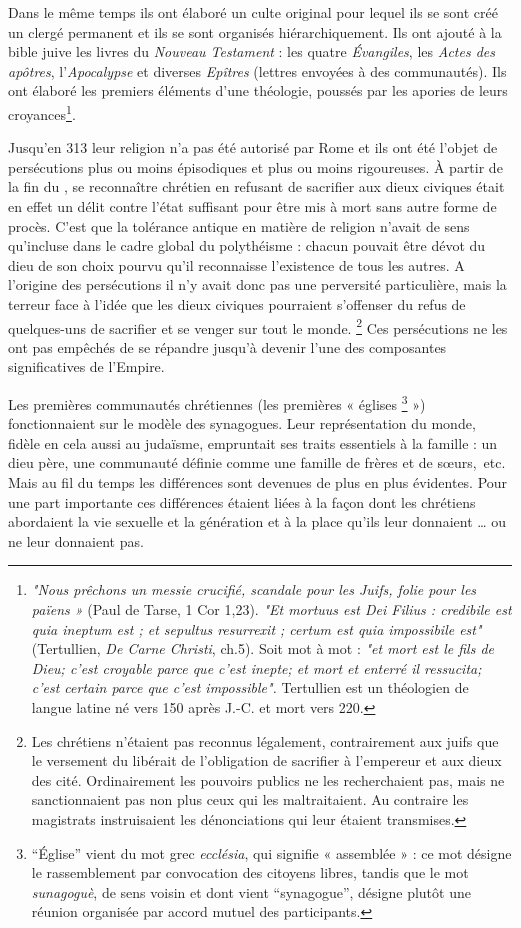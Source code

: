 Dans le même temps ils ont élaboré un culte original pour lequel ils se sont créé un clergé permanent et ils se sont organisés hiérarchiquement. Ils ont ajouté à la bible juive les livres du \emph{Nouveau Testament} : les quatre \emph{Évangiles}, les \emph{Actes des apôtres}, l'\emph{Apocalypse} et diverses \emph{Epîtres} (lettres envoyées à des communautés). Ils ont élaboré les premiers éléments d'une théologie, poussés par les apories de leurs croyances\footnote{\emph{"Nous prêchons un messie crucifié, scandale pour les Juifs, folie pour les païens »}  (Paul de Tarse, 1 Cor 1,23). \emph{"Et mortuus est Dei Filius : credibile est quia ineptum est ; et sepultus resurrexit ; certum est quia impossibile est"} (Tertullien, \emph{De Carne Christi}, ch.5). Soit mot à mot : \emph{"et mort est le fils de Dieu; c'est croyable parce que c'est inepte; et mort et enterré il ressucita; c'est certain parce que c'est impossible".}  Tertullien est un théologien de langue latine né vers 150 après J.-C. et mort vers 220.}.

Jusqu'en 313 leur religion n'a pas été autorisé par Rome et ils ont été l'objet de persécutions plus ou moins épisodiques et plus ou moins rigoureuses. À partir de la fin du , se reconnaître chrétien en refusant de sacrifier aux dieux civiques était en effet un délit contre l'état suffisant pour être mis à mort sans autre forme de procès. C'est que la tolérance antique en matière de religion n'avait de sens qu'incluse dans le cadre global du polythéisme : chacun pouvait être dévot du dieu de son choix pourvu qu'il reconnaisse l'existence de tous les autres. A l'origine des persécutions il n'y avait donc pas une perversité particulière, mais la terreur face à l'idée que les dieux civiques pourraient s'offenser du refus de quelques-uns de sacrifier et se venger sur tout le monde.
\footnote{Les chrétiens n'étaient pas reconnus légalement, contrairement aux juifs que le versement du  libérait de l'obligation de sacrifier à l'empereur et aux dieux des cité. Ordinairement les pouvoirs publics ne les recherchaient pas, mais ne sanctionnaient pas non plus ceux qui les maltraitaient. Au contraire les magistrats instruisaient les dénonciations qui leur étaient transmises.}  
Ces persécutions ne les ont pas empêchés de se répandre jusqu'à devenir l'une des composantes significatives de l'Empire. 

 Les premières communautés chrétiennes (les premières « églises%
\footnote{\enquote{Église} vient du mot grec \emph{ecclésia}, qui signifie « assemblée » : ce mot désigne le rassemblement par convocation des citoyens libres, tandis que le mot \emph{sunagoguè}, de sens voisin et dont vient \enquote{synagogue}, désigne plutôt une réunion organisée par accord mutuel des participants.}
») fonctionnaient sur le modèle des synagogues. Leur représentation du monde, fidèle en cela aussi au judaïsme, empruntait ses traits essentiels à la famille : un dieu père, une communauté définie comme une famille de frères et de sœurs,~etc. Mais au fil du temps les différences sont devenues de plus en plus évidentes. Pour une part importante ces différences étaient liées à la façon dont les chrétiens abordaient la vie sexuelle et la génération et à la place qu'ils leur donnaient … ou ne leur donnaient pas. 


